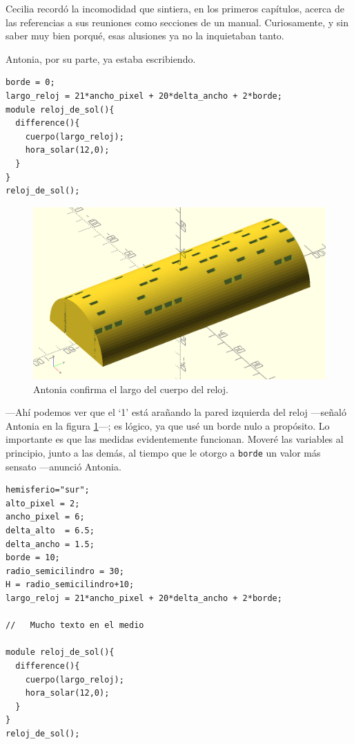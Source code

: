 Cecilia recordó la incomodidad que sintiera, en los primeros
capítulos, acerca de las referencias a sus reuniones como secciones de
un manual. Curiosamente, y sin saber muy bien porqué, esas alusiones
ya no la inquietaban tanto.

Antonia, por su parte, ya estaba escribiendo.


\begin{lstlisting}
borde = 0;
largo_reloj = 21*ancho_pixel + 20*delta_ancho + 2*borde;
module reloj_de_sol(){
  difference(){
    cuerpo(largo_reloj);
    hora_solar(12,0);
  }
}
reloj_de_sol();
\end{lstlisting}%

\begin{figure}[ht]
  \centering
  \includegraphics[width=.75\textwidth]{imagenes/cuerpo-del-reloj-b}
  \caption[Largo del reloj II.]{Antonia confirma el largo del cuerpo
    del reloj.}
  \label{fig:cuerpo-del-reloj-b}
\end{figure}
  

---Ahí podemos ver que el `1' está arañando la pared izquierda del
reloj ---señaló Antonia en la figura \ref{fig:cuerpo-del-reloj-b}---;
es lógico, ya que usé un borde nulo a propósito. Lo importante es que
las medidas evidentemente funcionan. Moveré las variables al
principio, junto a las demás, al tiempo que le otorgo a
\lstinline!borde! un valor más sensato ---anunció Antonia.

\begin{lstlisting}
hemisferio="sur";
alto_pixel = 2;
ancho_pixel = 6;
delta_alto  = 6.5;
delta_ancho = 1.5;
borde = 10;
radio_semicilindro = 30;
H = radio_semicilindro+10;
largo_reloj = 21*ancho_pixel + 20*delta_ancho + 2*borde;

//   Mucho texto en el medio

module reloj_de_sol(){
  difference(){
    cuerpo(largo_reloj);
    hora_solar(12,0);
  }
}
reloj_de_sol();
\end{lstlisting}%

